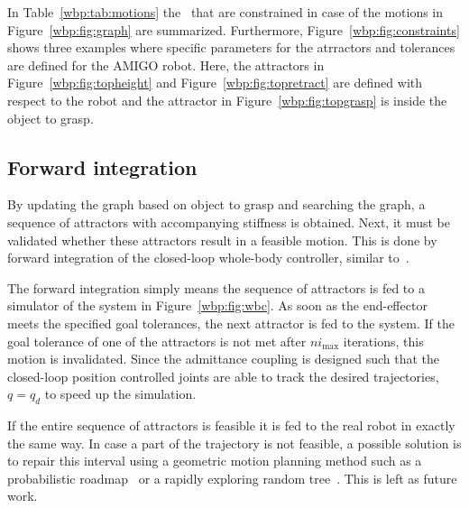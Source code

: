 In Table~\ref{wbp:tab:motions} the \dofs\ that are constrained in case of the motions in Figure~\ref{wbp:fig:graph} are summarized. Furthermore, Figure~\ref{wbp:fig:constraints} shows three examples where specific parameters for the atrractors and tolerances are defined for the AMIGO robot. Here, the attractors in Figure~\ref{wbp:fig:topheight} and Figure~\ref{wbp:fig:topretract} are defined with respect to the robot and the attractor in Figure~\ref{wbp:fig:topgrasp} is inside the object to grasp. 

\subsection{Forward integration}\label{wbp:ssec:feasibility}
By updating the graph based on object to grasp and searching the graph, a sequence of attractors with accompanying stiffness is obtained. Next, it must be validated whether these attractors result in a feasible motion. This is done by forward integration of the closed-loop whole-body controller, similar to~\citet{Behnisch2010}. 

The forward integration simply means the sequence of attractors is fed to a simulator of the system in Figure~\ref{wbp:fig:wbc}. 
As soon as the end-effector meets the specified goal tolerances, the next attractor is fed to the system. If the goal tolerance of one of the attractors is not met after $ni_{\max}$ iterations, this motion is invalidated.
Since the admittance coupling is designed such that the closed-loop position controlled joints are able to track the desired trajectories, $q = q_d$ to speed up the simulation.

If the entire sequence of attractors is feasible it is fed to the real robot in exactly the same way. In case a part of the trajectory is not feasible, a possible solution is to repair this interval using a geometric motion planning method such as a probabilistic roadmap~\citep{OBPRM1998,Laumond2000,Kurniawati2004,Yeh2012} or a rapidly exploring random tree~\citep{Hsu1997,Kuffner2000}. This is left as future work.


